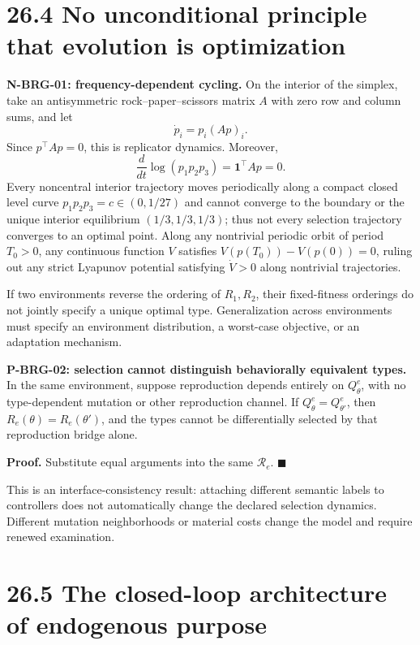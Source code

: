 \documentclass[
  english,
  11pt,
  oneside]{book}
\begin{document}
\section{26.4 No unconditional principle that evolution is optimization}\label{no-unconditional-principle-that-evolution-is-optimization}

\textbf{N-BRG-01: frequency-dependent cycling.} On the interior of the simplex, take an antisymmetric rock--paper--scissors matrix \(A\) with zero row and column sums, and let \[\dot p_i=p_i(Ap)_i.\] Since \(p^\top Ap=0\), this is replicator dynamics. Moreover, \[\frac{d}{dt}\log(p_1p_2p_3)=\mathbf1^\top Ap=0.\] Every noncentral interior trajectory moves periodically along a compact closed level curve \(p_1p_2p_3=c\in(0,1/27)\) and cannot converge to the boundary or the unique interior equilibrium \((1/3,1/3,1/3)\); thus not every selection trajectory converges to an optimal point. Along any nontrivial periodic orbit of period \(T_0>0\), any continuous function \(V\) satisfies \(V(p(T_0))-V(p(0))=0\), ruling out any strict Lyapunov potential satisfying \(\dot V>0\) along nontrivial trajectories.

If two environments reverse the ordering of \(R_1,R_2\), their fixed-fitness orderings do not jointly specify a unique optimal type. Generalization across environments must specify an environment distribution, a worst-case objective, or an adaptation mechanism.

\hypertarget{p-brg-02}{}\label{p-brg-02}

\textbf{P-BRG-02: selection cannot distinguish behaviorally equivalent types.} In the same environment, suppose reproduction depends entirely on \(Q_\theta^e\), with no type-dependent mutation or other reproduction channel. If \(Q_\theta^e=Q_{\theta'}^e\), then \(R_e(\theta)=R_e(\theta')\), and the types cannot be differentially selected by that reproduction bridge alone.

\textbf{Proof.} Substitute equal arguments into the same \(\mathcal R_e\). \(\blacksquare\)

This is an interface-consistency result: attaching different semantic labels to controllers does not automatically change the declared selection dynamics. Different mutation neighborhoods or material costs change the model and require renewed examination.

\section{26.5 The closed-loop architecture of endogenous purpose}\label{the-closed-loop-architecture-of-endogenous-purpose}
\end{document}
